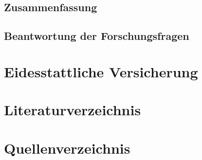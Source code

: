 \documentclass[10pt]{article}
\begin{document}
\subsection{Zusammenfassung}
\subsection{Beantwortung der Forschungsfragen}
\section{Eidesstattliche Versicherung}
\newpage
\section{Literaturverzeichnis}
\printbibliography
\newpage
\section{Quellenverzeichnis}
\end{document}
